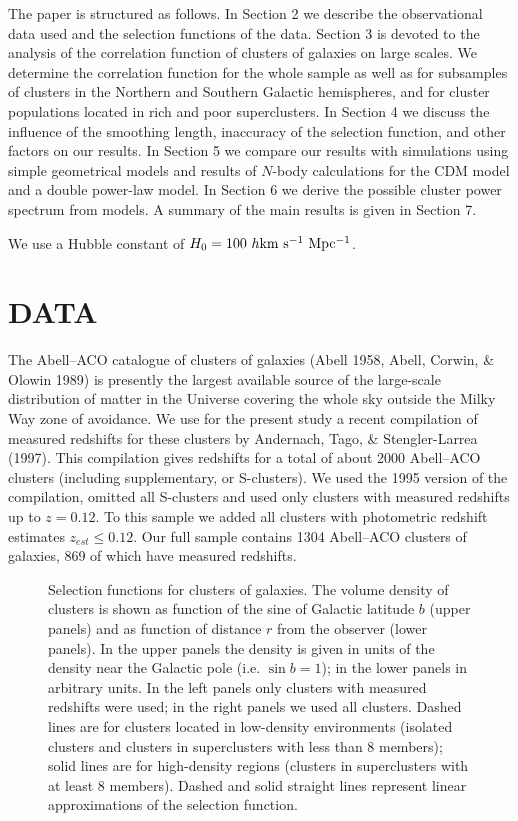 The  paper is structured as follows.  In  Section 2 we
describe the observational data used and the selection functions of
the data. Section 3 is devoted to the analysis of the correlation
function of clusters of galaxies on large scales. We determine the
correlation function for the whole sample as well as for subsamples of
clusters in the Northern and Southern Galactic hemispheres, and for
cluster populations located in rich and poor superclusters.  In
Section 4 we discuss the influence of the smoothing length, inaccuracy
of the selection function, and other factors on our results.  In
Section 5 we compare our results with simulations using simple
geometrical models and results of $N$-body calculations for the CDM
model and a double power-law model. In Section 6 we derive the
possible cluster power spectrum from models.
A summary of the main results is given in Section 7.

We use a Hubble constant of $H_0 = 100~h {\rm km~s^{-1}~Mpc^{-1}}$.

\section{DATA} \label{data}

The Abell--ACO catalogue of clusters of galaxies (Abell 1958, Abell,
Corwin, \& Olowin 1989) is presently the largest available source of
the large-scale distribution of matter in the Universe covering the
whole sky outside the Milky Way zone of avoidance. We use for the
present study a recent compilation of measured redshifts for these
clusters by Andernach, Tago, \& Stengler-Larrea (1997). This
compilation gives redshifts for a total of about 2000 Abell--ACO
clusters (including supplementary, or S-clusters). We used the 1995
version of the compilation, omitted all S-clusters and used only
clusters with measured redshifts up to $z=0.12$.  To this sample we
added all clusters with photometric redshift estimates $z_{est}\le
0.12$.  Our full sample contains 1304 Abell--ACO clusters of galaxies,
869 of which have measured redshifts.  

\begin{figure}
\vskip 2cm
\epsfysize=7cm 
\caption{
  Selection functions for clusters of galaxies.  The volume density of
  clusters is shown as function of the sine of Galactic latitude $b$ (upper
  panels) and as function of distance $r$ from the observer (lower panels). In
  the upper panels the density is given in units of the density near the
  Galactic pole (i.e. $\sin b = 1$); in the lower panels in arbitrary units. In
  the left panels only clusters with measured redshifts were used; in the
  right panels we used all clusters.  Dashed lines are for clusters located in
  low-density environments (isolated clusters and clusters in superclusters
  with less than 8 members); solid lines are for high-density regions
  (clusters in superclusters with at least 8 members). Dashed and solid
  straight lines represent linear approximations of the selection function.}
\label{fig1}
\end{figure}

